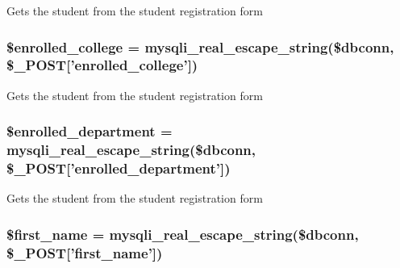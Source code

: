 \-Gets the student from the student registration form \hypertarget{admin__view_2validate_2studentVal_8php_a4918f9ca4d470ccadff836850844ea58}{
\subsubsection[{\$enrolled\-\_\-college}]{\setlength{\rightskip}{0pt plus 5cm}\$enrolled\-\_\-college = mysqli\-\_\-real\-\_\-escape\-\_\-string(\$dbconn, \$\-\_\-\-P\-O\-S\-T\mbox{[}'enrolled\-\_\-college'\mbox{]})}}\label{admin__view_2validate_2studentVal_8php_a4918f9ca4d470ccadff836850844ea58}
\-Gets the student from the student registration form \hypertarget{admin__view_2validate_2studentVal_8php_a2c21a55b0bd902797539f840b7bf94dc}{
\subsubsection[{\$enrolled\-\_\-department}]{\setlength{\rightskip}{0pt plus 5cm}\$enrolled\-\_\-department = mysqli\-\_\-real\-\_\-escape\-\_\-string(\$dbconn, \$\-\_\-\-P\-O\-S\-T\mbox{[}'enrolled\-\_\-department'\mbox{]})}}\label{admin__view_2validate_2studentVal_8php_a2c21a55b0bd902797539f840b7bf94dc}
\-Gets the student from the student registration form \hypertarget{admin__view_2validate_2studentVal_8php_ae0a75279f3627fb32311bc3352c89fe6}{
\subsubsection[{\$first\-\_\-name}]{\setlength{\rightskip}{0pt plus 5cm}\$first\-\_\-name = mysqli\-\_\-real\-\_\-escape\-\_\-string(\$dbconn, \$\-\_\-\-P\-O\-S\-T\mbox{[}'first\-\_\-name'\mbox{]})}}\label{admin__view_2validate_2studentVal_8php_ae0a75279f3627fb32311bc3352c89fe6}
